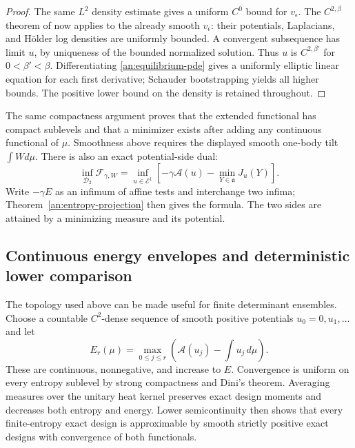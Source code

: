 \begin{proof}
The same $L^2$ density estimate gives a uniform $C^0$ bound for
$v_\epsilon$. The $C^{2,\beta}$ theorem of \citet[Theorem 1.1]{TWWY2015} now applies
to the already smooth $v_\epsilon$: their potentials, Laplacians, and
H\"older log densities are uniformly bounded. A convergent subsequence
has limit $u$, by uniqueness of the bounded normalized solution.
Thus $u$ is $C^{2,\beta'}$ for $0<\beta'<\beta$. Differentiating
\eqref{an:equilibrium-pde} gives a uniformly elliptic linear equation
for each first derivative; Schauder bootstrapping yields all higher
bounds. The positive lower bound on the density is retained throughout.
\end{proof}

The same compactness argument proves that the extended functional has
compact sublevels and that a minimizer exists after adding any continuous
functional of $\mu$. Smoothness above requires the displayed smooth
one-body tilt $\int Wd\mu$. There is also an exact potential-side dual:
\begin{equation}
 \inf_{\mathcal D_2}\mathcal F_{\gamma,W}
 =\inf_{u\in\mathcal E^1}
 \left[-\gamma\mathcal A(u)-\min_{Y\in\mathfrak a}J_u(Y)\right].
 \label{an:dual-equilibrium}
\end{equation}
Write $-\gamma E$ as an infimum of affine tests and interchange two
infima; Theorem~\ref{an:entropy-projection} then gives the formula.
The two sides are attained by a minimizing measure and its potential.

\subsection{Continuous energy envelopes and deterministic lower comparison}

The topology used above can be made useful for finite determinant
ensembles. Choose a countable $C^2$-dense sequence of smooth positive
potentials $u_0=0,u_1,\ldots$ and let
\begin{equation}
 E_r(\mu)=\max_{0\le j\le r}
 \left(\mathcal A(u_j)-\int u_j\,d\mu\right).
 \label{an:continuous-envelopes}
\end{equation}
These are continuous, nonnegative, and increase to $E$. Convergence is
uniform on every entropy sublevel by strong compactness and Dini's
theorem. Averaging measures over the unitary heat kernel preserves exact
design moments and decreases both entropy and energy. Lower
semicontinuity then shows that every finite-entropy exact design is
approximable by smooth strictly positive exact designs with convergence
of both functionals.

